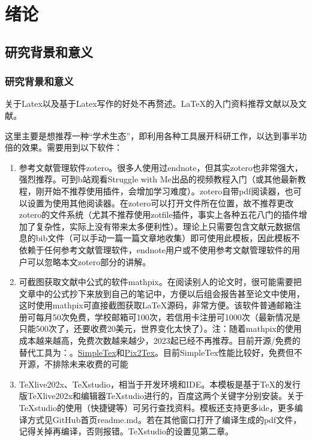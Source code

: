 \chapter{绪论}

\section{研究背景和意义}
\subsection{研究背景和意义}

关于Latex以及基于Latex写作的好处不再赘述。\LaTeX{}的入门资料推荐文献\parencite{_g}以及文献\parencite{_c}。

这里主要是想推荐一种“学术生态”，即利用各种工具展开科研工作，以达到事半功倍的效果。需要用到以下软件：
\begin{enumerate}[topsep = 0 pt, itemsep= 0 pt, parsep=0pt, partopsep=0pt, leftmargin=44pt, itemindent=0pt, labelsep=6pt, label=(\arabic*)]
	\item 	参考文献管理软件zotero\cite{_m}。很多人使用过endnote，但其实zotero也非常强大，强烈推荐。可到b站观看Struggle with Me出品的视频教程\cite{_k}入门（或其他最新教程，刚开始不推荐使用插件，会增加学习难度）。zotero自带pdf阅读器，也可以设置为使用其他阅读器。在zotero可以打开文件所在位置，故不推荐更改zotero的文件系统（尤其不推荐使用zotfile插件，事实上各种五花八门的插件增加了复杂性，实际上没有带来太多便利性）。理论上只需要包含文献元数据信息的bib文件（可以手动一篇一篇文章地收集）即可使用此模板，因此模板不依赖于任何参考文献管理软件，endnote用户或不使用参考文献管理软件的用户可以忽略本文zotero部分的讲解。
	\item	可截图获取文献中公式的软件mathpix\cite{_h}。在阅读别人的论文时，很可能需要把文章中的公式抄下来放到自己的笔记中，方便以后组会报告甚至论文中使用，这时使用mathpix可直接截图获取\LaTeX{}源码，非常方便。该软件普通邮箱注册可每月50次免费，学校邮箱可100次，若信用卡注册可1000次（最新情况是只能500次了，还要收费20美元，世界变化太快了）。注：随着mathpix的使用成本越来越高，免费次数越来越少，2023起已经不再推荐。目前开源/免费的替代工具为：。\href{https://www.simpletex.cn/}{SimpleTex}和\href{https://p2t.breezedeus.com/}{Pix2Tex}。目前SimpleTex性能比较好，免费但不开源，不排除未来收费的可能
	\item	TeXlive202x、TeXstudio，相当于开发环境和IDE。本模板是基于TeX的发行版TeXlive202x和编辑器TeXstudio进行的，百度这两个关键字分别安装。关于TeXstudio的使用（快捷键等）可另行查找资料。模板还支持更多ide，更多编译方式见GitHub首页readme.md。若在其他窗口打开了编译生成的pdf文件，记得关掉再编译，否则报错。TeXstudio的设置见第二章。
\end{enumerate}


